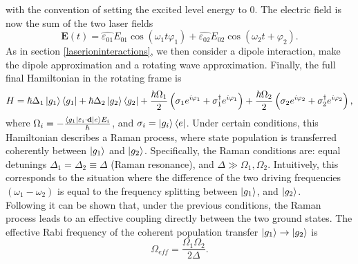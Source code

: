 with the convention of setting the excited level energy to 0. The electric field is now the sum of the two laser fields
\begin{equation}
\mathbf{E}(t) = \hat{\varepsilon_{01}} E_{01} \cos(\omega_{1} t \varphi_1) + \hat{\varepsilon_{02}} E_{02} \cos(\omega_2 t + \varphi_2).
\end{equation}
As in section \ref{laserioninteractions}, we then consider a dipole interaction, make the dipole approximation and a rotating wave approximation. Finally, the full final Hamiltonian in the rotating frame is
\begin{equation}
H = \hbar \Delta_1 \ket{g_1}\bra{g_1} + \hbar\Delta_2 \ket{g_2}\bra{g_2}+ \frac{\hbar \Omega_1}{2}\left(\sigma_1 e^{i\varphi_1} +\sigma_1^\dagger e^{i\varphi_1}\right)+ \frac{\hbar \Omega_2}{2}\left(\sigma_2 e^{i\varphi_2} +\sigma_2^\dagger e^{i\varphi_2}\right),
\end{equation}
where $\Omega_i = -\frac{\braket{g_1|\varepsilon_i \cdot \mathbf{d}|e}E_{i}}{\hbar}$, and $\sigma_i = \ket{g_i}\bra{e}$. Under certain conditions, this Hamiltonian describes a Raman process, where state population is transferred coherently between $\ket{g_1}$ and $\ket{g_2}$. Specifically, the Raman conditions are: equal detunings $\Delta_1 = \Delta_2 \equiv \Delta$ (Raman resonance), and $\Delta \gg \Omega_1,\Omega_2$.
Intuitively, this corresponds to the situation where the difference of the two driving frequencies $(\omega_1-\omega_2)$ is equal to the frequency splitting between $\ket{g_1}$, and $\ket{g_2}$.\\
Following \cite{russo} it can be shown that, under the previous conditions, the Raman process leads to an effective coupling directly between the two ground states. The effective Rabi frequency of the coherent population transfer $\ket{g_1} \to \ket{g_2}$ is \cite{steck}
\begin{equation}
\label{eq:effectiverabi}
\Omega_{eff} = \frac{\Omega_1\Omega_2}{2\Delta}.
\end{equation}

